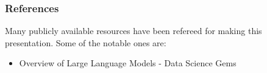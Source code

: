 \begin{frame}\frametitle{References}
Many publicly available resources have been refereed for making this presentation. Some of the notable ones are:
\footnotesize
\begin{itemize}
\item Overview of Large Language Models - Data Science Gems
\end{itemize}

\end{frame}